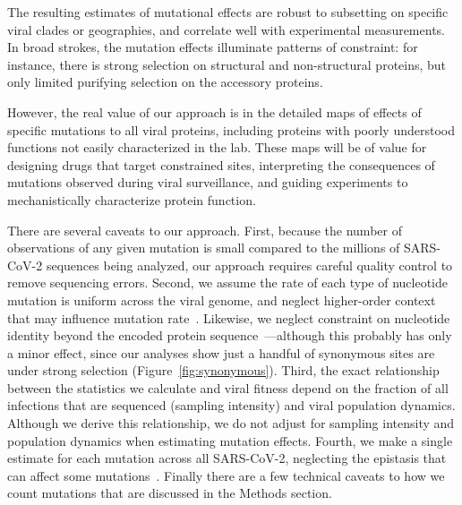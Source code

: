 \documentclass[9pt,twocolumn,twoside]{gsajnl_modified}
\begin{document}
The resulting estimates of mutational effects are robust to subsetting on specific viral clades or geographies, and correlate well with experimental measurements.
In broad strokes, the mutation effects illuminate patterns of constraint: for instance, there is strong selection on structural and non-structural proteins, but only limited purifying selection on the accessory proteins.

However, the real value of our approach is in the detailed maps of effects of specific mutations to all viral proteins, including proteins with poorly understood functions not easily characterized in the lab.
These maps will be of value for designing drugs that target constrained sites, interpreting the consequences of mutations observed during viral surveillance, and guiding experiments to mechanistically characterize protein function.

There are several caveats to our approach.
First, because the number of observations of any given mutation is small compared to the millions of SARS-CoV-2 sequences being analyzed, our approach requires careful quality control to remove sequencing errors.
Second, we assume the rate of each type of nucleotide mutation is uniform across the viral genome, and neglect higher-order context that may influence mutation rate~\citep{sadykov2021short,beale2004comparison}.
Likewise, we neglect constraint on nucleotide identity beyond the encoded protein sequence~\citep{huston2021comprehensive,kuo2013functional}---although this probably has only a minor effect, since our analyses show just a handful of synonymous sites are under strong selection (Figure~\ref{fig:synonymous}).
Third, the exact relationship between the statistics we calculate and viral fitness depend on the fraction of all infections that are sequenced (sampling intensity) and viral population dynamics.
Although we derive this relationship, we do not adjust for sampling intensity and population dynamics when estimating mutation effects.
Fourth, we make a single estimate for each mutation across all SARS-CoV-2, neglecting the epistasis that can affect some mutations~\citep{starr2022shifting,moulana2022compensatory}.
Finally there are a few technical caveats to how we count mutations that are discussed in the Methods section.
\end{document}
